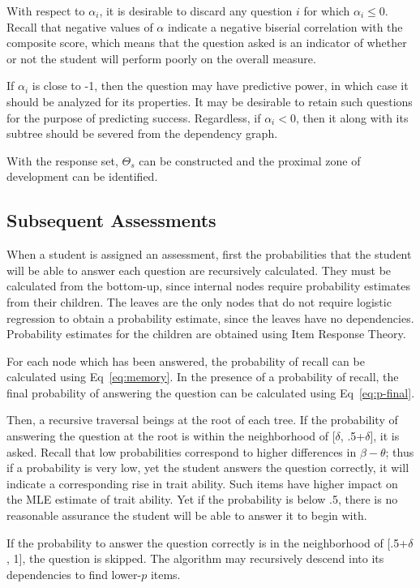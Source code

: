 With respect to $\alpha_i$, it is desirable to discard any question $i$ for
which $\alpha_i \leq 0$.  Recall that negative values of $\alpha$ indicate a
negative biserial correlation with the composite score, which means that the
question asked is an indicator of whether or not the student will perform
poorly on the overall measure.  

If $\alpha_i$ is close to -1, then the question may have predictive power, in
which case it should be analyzed for its properties.  It may be desirable to
retain such questions for the purpose of predicting success.  Regardless, if
$\alpha_i < 0$, then it along with its subtree should be severed from the
dependency graph.

With the response set, $\Theta_s$ can be constructed and the proximal zone of
development can be identified.

\subsection{Subsequent Assessments}

When a student is assigned an assessment, first the probabilities that the
student will be able to answer each question are recursively calculated.  They
must be calculated from the bottom-up, since internal nodes require probability
estimates from their children.  The leaves are the only nodes that do not
require logistic regression to obtain a probability estimate, since the leaves
have no dependencies.  Probability estimates for the children are obtained
using Item Response Theory.

For each node which has been answered, the probability of recall can be
calculated using Eq~\ref{eq:memory}.  In the presence of a probability of
recall, the final probability of answering the question can be calculated
using Eq~\ref{eq:p-final}.  

Then, a recursive traversal beings at the root of each tree.  If the
probability of answering the question at the root is within the neighborhood of
[$\delta$, .5+$\delta$], it is asked.  Recall that low probabilities correspond
to higher differences in $\beta-\theta$; thus if a probability is very low, yet
the student answers the question correctly, it will indicate a corresponding
rise in trait ability.  Such items have higher impact on the MLE estimate of
trait ability.  Yet if the probability is below .5, there is no reasonable
assurance the student will be able to answer it to begin with.

If the probability to answer the question correctly is in the neighborhood of
[.5+$\delta$, 1],  the question is skipped.  The algorithm may recursively
descend into its dependencies to find lower-$p$ items.

